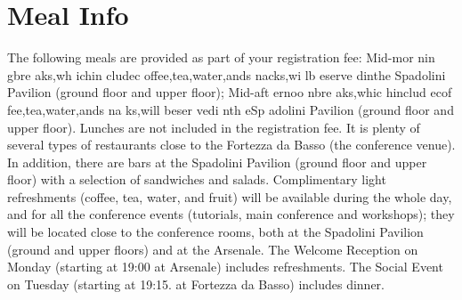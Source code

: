 \chapter{Meal Info}
\vspace*{0.2cm}

The following meals are provided as part of your registration fee:
Mid-mor nin gbre aks,wh ichin cludec offee,tea,water,ands nacks,wi lb eserve dinthe Spadolini Pavilion (ground floor and upper floor);
Mid-aft ernoo nbre aks,whic hinclud ecof fee,tea,water,ands na ks,will beser vedi nth eSp adolini Pavilion (ground floor and upper floor).
Lunches are not included in the registration fee. It is plenty of several types of restaurants close to the Fortezza da Basso (the conference venue). In addition, there are bars at the Spadolini Pavilion (ground floor and upper floor) with a selection of sandwiches and salads.
Complimentary light refreshments (coffee, tea, water, and fruit) will be available during the whole day, and for all the conference events (tutorials, main conference and workshops); they will be located close to the conference rooms, both at the Spadolini Pavilion (ground and upper floors) and at the Arsenale.
The Welcome Reception on Monday (starting at 19:00 at Arsenale) includes refreshments. The Social Event on Tuesday (starting at 19:15. at Fortezza da Basso) includes dinner.